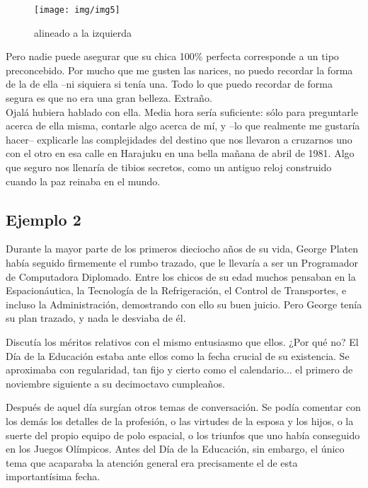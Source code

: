 \documentclass[11pt,letterpaper]{article}
\begin{document}
	\begin{wrapfigure}{r}{0.4\textwidth}
		\centering
		\texttt{[image: img/img5]}
		\caption{alineado a la izquierda}
	\end{wrapfigure}

Pero nadie puede asegurar que su chica 100\% perfecta corresponde a un tipo preconcebido. Por mucho que me gusten las narices, no puedo recordar la forma de la de ella –ni siquiera si tenía una. Todo lo que puedo recordar de forma segura es que no era una gran belleza. Extraño. \\

Ojalá hubiera hablado con ella. Media hora sería suficiente: sólo para preguntarle acerca de ella misma, contarle algo acerca de mí, y –lo que realmente me gustaría hacer– explicarle las complejidades del destino que nos llevaron a cruzarnos uno con el otro en esa calle en Harajuku en una bella mañana de abril de 1981. Algo que seguro nos llenaría de tibios secretos, como un antiguo reloj construido cuando la paz reinaba en el mundo.
	
	
	\subsection{Ejemplo 2}
	
	Durante la mayor parte de los primeros dieciocho años de su vida, George Platen había seguido firmemente el rumbo trazado, que le llevaría a ser un Programador de Computadora Diplo­mado. Entre los chicos de su edad muchos pensaban en la Espacionáutica, la Tecnología de la Refrigeración, el Control de Transportes, e incluso la Administración, demostrando con ello su buen juicio. Pero George tenía su plan trazado, y nada le des­viaba de él.

Discutía los méritos relativos con el mismo entusiasmo que ellos. ¿Por qué no? El Día de la Educación estaba ante ellos como la fecha crucial de su existencia. Se aproximaba con regularidad, tan fijo y cierto como el calendario... el primero de noviembre siguiente a su decimoctavo cumpleaños.

Después de aquel día surgían otros temas de conversación. Se podía comentar con los demás los detalles de la profesión, o las virtudes de la esposa y los hijos, o la suerte del propio equipo de polo espacial, o los triunfos que uno había conseguido en los Juegos Olímpicos. Antes del Día de la Educación, sin embargo, el único tema que acaparaba la atención general era precisamente el de esta importantísima fecha.
\end{document}
